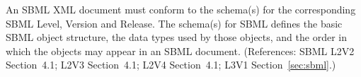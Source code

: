 An SBML XML document must conform to the schema(s) for the corresponding
SBML Level, Version and Release.  The schema(s) for SBML defines the basic
SBML object structure, the data types used by those objects, and the order
in which the objects may appear in an SBML document.  (References: SBML
L2V2 Section~4.1; L2V3 Section~4.1; L2V4 Section~4.1; L3V1 Section~\ref{sec:sbml}.)
